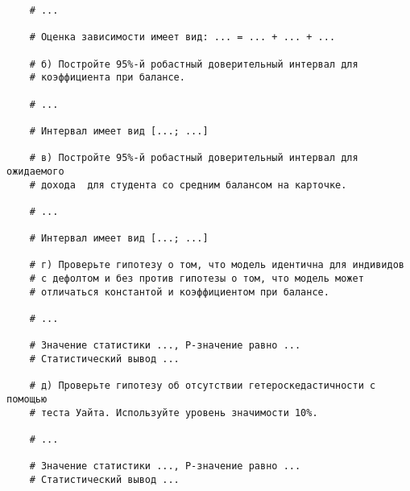 \documentclass[12pt]{article}
\begin{document}
\begin{enumerate}
\begin{verbatim}
    # ...

    # Оценка зависимости имеет вид: ... = ... + ... + ...

    # б) Постройте 95%-й робастный доверительный интервал для 
    # коэффициента при балансе. 

    # ...

    # Интервал имеет вид [...; ...]

    # в) Постройте 95%-й робастный доверительный интервал для ожидаемого 
    # дохода  для студента со средним балансом на карточке. 

    # ... 

    # Интервал имеет вид [...; ...]

    # г) Проверьте гипотезу о том, что модель идентична для индивидов 
    # с дефолтом и без против гипотезы о том, что модель может 
    # отличаться константой и коэффициентом при балансе. 

    # ...

    # Значение статистики ..., P-значение равно ...
    # Статистический вывод ...

    # д) Проверьте гипотезу об отсутствии гетероскедастичности с помощью 
    # теста Уайта. Используйте уровень значимости 10%.
    
    # ...

    # Значение статистики ..., P-значение равно ...
    # Статистический вывод ...
\end{verbatim}



\end{enumerate}
\end{document}
